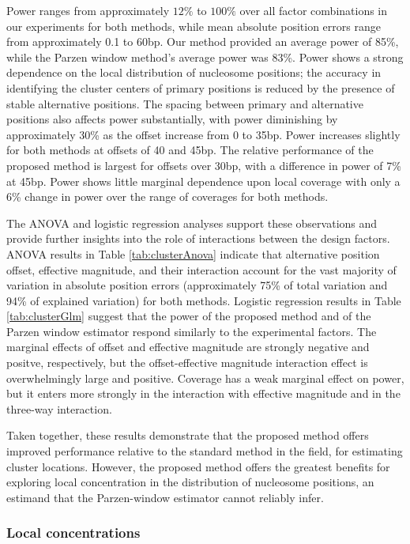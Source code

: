 Power ranges from approximately $12\%$ to $100\%$ over all factor combinations in our experiments for both methods, while mean absolute position errors range from approximately 0.1 to 60bp.
Our method provided an average power of 85\%, while the Parzen window method's average power was 83\%.
Power shows a strong dependence on the local distribution of nucleosome positions; the accuracy in identifying the cluster centers of primary positions is reduced by the presence of stable alternative positions.
The spacing between primary and alternative positions also affects power substantially, with power diminishing by approximately 30\% as the offset increase from 0 to 35bp.
Power increases slightly for both methods at offsets of 40 and 45bp.
The relative performance of the proposed method is largest for offsets over 30bp, with a difference in power of 7\% at 45bp.
Power shows little marginal dependence upon local coverage with only a 6\% change in power over the range of coverages for both methods.

The ANOVA and logistic regression analyses support these observations and provide further insights into the role of interactions between the design factors.
ANOVA results in Table \ref{tab:clusterAnova} indicate that alternative position offset, effective magnitude, and their interaction account for the vast majority of variation in absolute position errors (approximately 75\% of total variation and 94\% of explained variation) for both methods.
Logistic regression results in Table \ref{tab:clusterGlm} suggest that the power of the proposed method and of the Parzen window estimator respond similarly to the experimental factors.
The marginal effects of offset and effective magnitude are strongly negative and positve, respectively, but the offset-effective magnitude interaction effect is overwhelmingly large and positive.
Coverage has a weak marginal effect on power, but it enters more strongly in the interaction with effective magnitude and in the three-way interaction.

Taken together, these results demonstrate that the proposed method offers improved performance relative to the standard method in the field, for estimating cluster locations.
However, the proposed method offers the greatest benefits for exploring  local concentration in the distribution of nucleosome positions, an estimand that the Parzen-window estimator cannot reliably infer.

\subsubsection{Local concentrations}
\label{sec:localPower}

